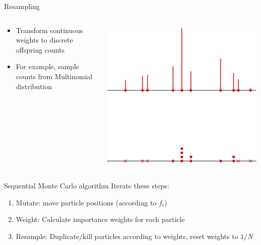 \documentclass[aspectratio=169]{beamer}
\theoremstyle{definition}
\begin{document}
\begin{frame}{Resampling}
\begin{columns}
\begin{column}{0.45\textwidth}
\begin{itemize}
\item Transform continuous weights to discrete offspring counts
\item For example, sample counts from Multinomial distribution 
\end{itemize}
\end{column}
\begin{column}{0.45\textwidth}
\centering
\includegraphics[width=\textwidth]{resample1.pdf} \\
\includegraphics[width=\textwidth]{resample2.pdf}
\end{column}
\end{columns}

\end{frame}


\begin{frame}{Sequential Monte Carlo algorithm}
Iterate these steps:
\begin{enumerate}
\item Mutate: move particle positions (according to $f_t$)
\item Weight: Calculate importance weights for each particle
\item Resample: Duplicate/kill particles according to weights, reset weights to $1/N$
\end{enumerate}
\end{frame}
\end{document}
